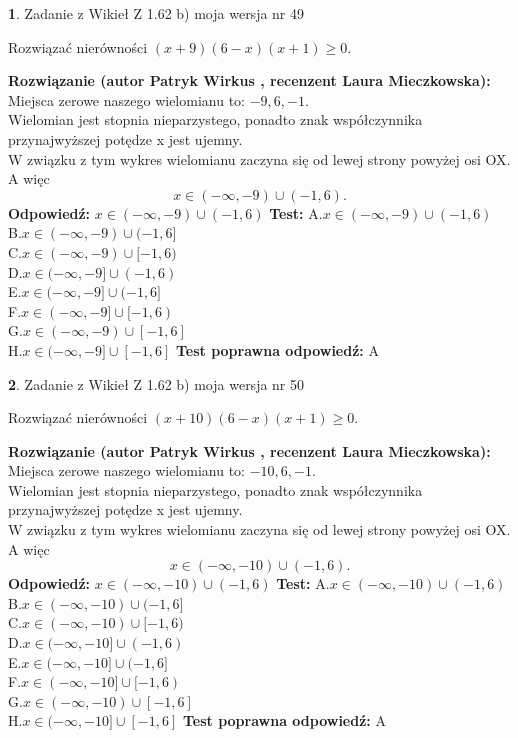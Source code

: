 \documentclass[12pt, a4paper]{article}
\theoremstyle{definition} %
\newtheorem{zad}{}
\newcommand{\zadStart}[1]{\begin{zad}#1\newline}
\newcommand{\zadStop}{\end{zad}}
\newcommand{\rozwStart}[2]{\noindent \textbf{Rozwiązanie (autor #1 , recenzent #2): }\newline}
\newcommand{\rozwStop}{\newline}
\newcommand{\odpStart}{\noindent \textbf{Odpowiedź:}\newline}
\newcommand{\odpStop}{\newline}
\newcommand{\testStart}{\noindent \textbf{Test:}\newline}
\newcommand{\testStop}{\newline}
\newcommand{\kluczStart}{\noindent \textbf{Test poprawna odpowiedź:}\newline}
\newcommand{\kluczStop}{\newline}
\begin{document}
\zadStart{Zadanie z Wikieł Z 1.62 b) moja wersja nr 49}

Rozwiązać nierówności $(x+9)(6-x)(x+1)\ge0$.
\zadStop
\rozwStart{Patryk Wirkus}{Laura Mieczkowska}
Miejsca zerowe naszego wielomianu to: $-9, 6, -1$.\\
Wielomian jest stopnia nieparzystego, ponadto znak współczynnika przy\linebreak najwyższej potędze x jest ujemny.\\ W związku z tym wykres wielomianu zaczyna się od lewej strony powyżej osi OX. A więc $$x \in (-\infty,-9) \cup (-1,6).$$
\rozwStop
\odpStart
$x \in (-\infty,-9) \cup (-1,6)$
\odpStop
\testStart
A.$x \in (-\infty,-9) \cup (-1,6)$\\
B.$x \in (-\infty,-9) \cup (-1,6]$\\
C.$x \in (-\infty,-9) \cup [-1,6)$\\
D.$x \in (-\infty,-9] \cup (-1,6)$\\
E.$x \in (-\infty,-9] \cup (-1,6]$\\
F.$x \in (-\infty,-9] \cup [-1,6)$\\
G.$x \in (-\infty,-9) \cup [-1,6]$\\
H.$x \in (-\infty,-9] \cup [-1,6]$
\testStop
\kluczStart
A
\kluczStop



\zadStart{Zadanie z Wikieł Z 1.62 b) moja wersja nr 50}

Rozwiązać nierówności $(x+10)(6-x)(x+1)\ge0$.
\zadStop
\rozwStart{Patryk Wirkus}{Laura Mieczkowska}
Miejsca zerowe naszego wielomianu to: $-10, 6, -1$.\\
Wielomian jest stopnia nieparzystego, ponadto znak współczynnika przy\linebreak najwyższej potędze x jest ujemny.\\ W związku z tym wykres wielomianu zaczyna się od lewej strony powyżej osi OX. A więc $$x \in (-\infty,-10) \cup (-1,6).$$
\rozwStop
\odpStart
$x \in (-\infty,-10) \cup (-1,6)$
\odpStop
\testStart
A.$x \in (-\infty,-10) \cup (-1,6)$\\
B.$x \in (-\infty,-10) \cup (-1,6]$\\
C.$x \in (-\infty,-10) \cup [-1,6)$\\
D.$x \in (-\infty,-10] \cup (-1,6)$\\
E.$x \in (-\infty,-10] \cup (-1,6]$\\
F.$x \in (-\infty,-10] \cup [-1,6)$\\
G.$x \in (-\infty,-10) \cup [-1,6]$\\
H.$x \in (-\infty,-10] \cup [-1,6]$
\testStop
\kluczStart
A
\kluczStop
\end{document}
